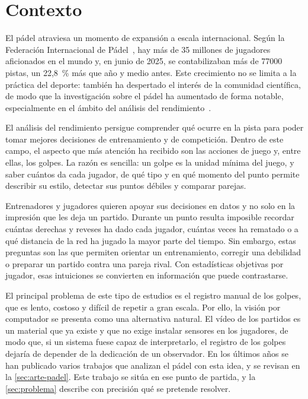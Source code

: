 
\section{Contexto}
\label{sec:contexto}

El pádel atraviesa un momento de expansión a escala internacional.
Según la Federación Internacional de Pádel~\cite{fip2025report}, hay más de 35 millones de jugadores aficionados en el mundo y, en junio de 2025, se contabilizaban más de \num{77000} pistas, un 22,8~\% más que año y medio antes.
Este crecimiento no se limita a la práctica del deporte: también ha despertado el interés de la comunidad científica, de modo que la investigación sobre el pádel ha aumentado de forma notable, especialmente en el ámbito del análisis del rendimiento~\cite{martinmiguel2023performance}.

El análisis del rendimiento persigue comprender qué ocurre en la pista para poder tomar mejores decisiones de entrenamiento y de competición.
Dentro de este campo, el aspecto que más atención ha recibido son las acciones de juego y, entre ellas, los golpes.
La razón es sencilla: un golpe es la unidad mínima del juego, y saber cuántos da cada jugador, de qué tipo y en qué momento del punto permite describir su estilo, detectar sus puntos débiles y comparar parejas.

Entrenadores y jugadores quieren apoyar sus decisiones en datos y no solo en la impresión que les deja un partido.
Durante un punto resulta imposible recordar cuántas derechas y reveses ha dado cada jugador, cuántas veces ha rematado o a qué distancia de la red ha jugado la mayor parte del tiempo.
Sin embargo, estas preguntas son las que permiten orientar un entrenamiento, corregir una debilidad o preparar un partido contra una pareja rival.
Con estadísticas objetivas por jugador, esas intuiciones se convierten en información que puede contrastarse.

El principal problema de este tipo de estudios es el registro manual de los golpes, que es lento, costoso y difícil de repetir a gran escala.
Por ello, la visión por computador se presenta como una alternativa natural.
El vídeo de los partidos es un material que ya existe y que no exige instalar sensores en los jugadores, de modo que, si un sistema fuese capaz de interpretarlo, el registro de los golpes dejaría de depender de la dedicación de un observador.
En los últimos años se han publicado varios trabajos que analizan el pádel con esta idea, y se revisan en la \cref{sec:arte-padel}.
Este trabajo se sitúa en ese punto de partida, y la \cref{sec:problema} describe con precisión qué se pretende resolver.

